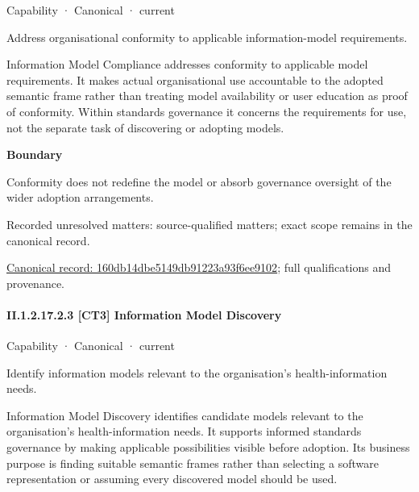 \label{element:160db14dbe5149db91223a93f6ee9102}
{\small Capability · Canonical · current}\par

Address organisational conformity to applicable information-model requirements.



Information Model Compliance addresses conformity to applicable model requirements. It makes actual organisational use accountable to the adopted semantic frame rather than treating model availability or user education as proof of conformity. Within standards governance it concerns the requirements for use, not the separate task of discovering or adopting models.



\textbf{Boundary}



Conformity does not redefine the model or absorb governance oversight of the wider adoption arrangements.


{\small Recorded unresolved matters: source-qualified matters; exact scope remains in the canonical record.}\par
{\footnotesize \href{../../../../continuum/strategy/capability/160db14dbe5149db91223a93f6ee9102.md}{Canonical record: 160db14dbe5149db91223a93f6ee9102}; full qualifications and provenance.}\par
\paragraph*{II.1.2.17.2.3 [CT3] Information Model Discovery}
\label{navigation:II.1.2.17.2.3}

\label{element:f33dc5b8ba9643329bb7b9431e1f9a6f}
{\small Capability · Canonical · current}\par

Identify information models relevant to the organisation’s health-information needs.



Information Model Discovery identifies candidate models relevant to the organisation's health-information needs. It supports informed standards governance by making applicable possibilities visible before adoption. Its business purpose is finding suitable semantic frames rather than selecting a software representation or assuming every discovered model should be used.



